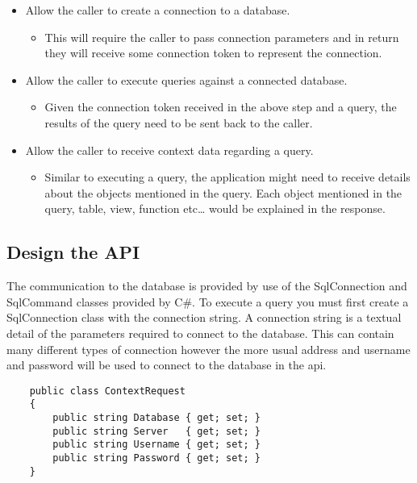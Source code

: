 \begin{itemize}
\tightlist
\item
  Allow the caller to create a connection to a database.

  \begin{itemize}
  \tightlist
  \item
    This will require the caller to pass connection parameters and in
    return they will receive some connection token to represent the
    connection.
  \end{itemize}
\item
  Allow the caller to execute queries against a connected database.

  \begin{itemize}
  \tightlist
  \item
    Given the connection token received in the above step and a query,
    the results of the query need to be sent back to the caller.
  \end{itemize}
\item
  Allow the caller to receive context data regarding a query.

  \begin{itemize}
  \tightlist
  \item
    Similar to executing a query, the application might need to receive
    details about the objects mentioned in the query. Each object
    mentioned in the query, table, view, function etc\ldots{} would be
    explained in the response.
  \end{itemize}
\end{itemize}

\subsection{Design the API}\label{design-the-api}

The communication to the database is provided by use of the
SqlConnection and SqlCommand classes provided by C\#. To execute a query
you must first create a SqlConnection class with the connection string.
A connection string is a textual detail of the parameters required to
connect to the database. This can contain many different types of
connection however the more usual address and username and password will
be used to connect to the database in the api.
\begin{listing}[ht]
\begin{verbatim}
    public class ContextRequest
    {
        public string Database { get; set; }
        public string Server   { get; set; }
        public string Username { get; set; }
        public string Password { get; set; }
    }
\end{verbatim}
\end{listing}

